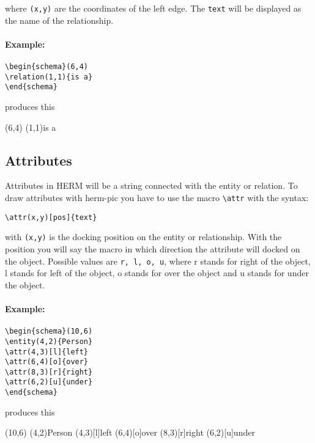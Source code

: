 \documentclass[a4paper,11pt]{article}
\begin{document}
where {\tt (x,y)} are the coordinates of the left edge. The {\tt text} will be displayed as 
the name of the relationship.

\paragraph{Example:}

\begin{verbatim}
\begin{schema}(6,4)
\relation(1,1){is a}
\end{schema}
\end{verbatim}

produces this

\begin{schema}(6,4)
\relation(1,1){is a}
\end{schema}

\subsection{Attributes}

Attributes in HERM will be a string connected with the entity or relation.
To draw attributes with herm-pic you have to use the macro \verb|\attr| with the syntax:

\begin{verbatim}
\attr(x,y)[pos]{text}
\end{verbatim}

with {\tt (x,y)} is the docking position on the entity or relationship. With the
position you will say the macro in which direction the attribute will docked on
the object. Possible values are {\tt r, l, o, u}, where r stands for right of the object,
l stands for left of the object, o stands for over the object and u stands for under the object.

\paragraph{Example:}

\begin{verbatim}
\begin{schema}(10,6)
\entity(4,2){Person}
\attr(4,3)[l]{left}
\attr(6,4)[o]{over}
\attr(8,3)[r]{right}
\attr(6,2)[u]{under}
\end{schema}
\end{verbatim}

produces this

\begin{schema}(10,6)
\entity(4,2){Person}
\attr(4,3)[l]{left}
\attr(6,4)[o]{over}
\attr(8,3)[r]{right}
\attr(6,2)[u]{under}
\end{schema}
\end{document}
